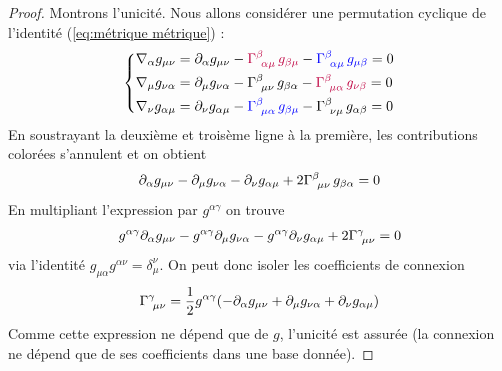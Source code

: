 \begin{proof}
    Montrons l'unicité. Nous allons considérer une permutation cyclique de l'identité (\ref{eq:métrique métrique}) :
    \begin{equation}
        \begin{dcases}
            \nabla_{\alpha}g_{\mu \nu} = \partial_{\alpha}g_{\mu \nu} - \textcolor{purple}{\Gamma\indices{^{\beta}_{\!\alpha \mu}}\,g_{\beta \mu}} - \textcolor{blue}{\Gamma\indices{^{\beta}_{\!\alpha \mu}}\,g_{\mu \beta}} = 0 \\
            \nabla_{\mu}g_{ \nu \alpha } = \partial_{\mu}g_{\nu \alpha} - \Gamma\indices{^{\beta}_{\!\mu \nu}}\,g_{\beta \alpha} - \textcolor{purple}{\Gamma\indices{^{\beta}_{\!\mu \alpha}}\,g_{\nu \beta}} = 0 \\
            \nabla_{\nu}g_{ \alpha \mu } = \partial_{\nu}g_{\alpha \mu} - \textcolor{blue}{\Gamma\indices{^{\beta}_{\!\mu \alpha}}\,g_{\beta \mu}} - \Gamma\indices{^{\beta}_{\!\nu \mu}}\,g_{\alpha \beta} = 0 
        \end{dcases}
    \end{equation}
    En soustrayant la deuxième et troisème ligne à la première, les contributions colorées s'annulent et on obtient
    \begin{equation}
        \partial_{\alpha}g_{\mu \nu} - \partial_{\mu}g_{\nu \alpha} - \partial_{\nu}g_{\alpha \mu} +2\Gamma\indices{^{\beta}_{\!\mu \nu}}\, g_{\beta \alpha} = 0
    \end{equation}
    En multipliant l'expression par $g^{\alpha\gamma}$ on trouve 
    \begin{equation}
        g^{\alpha \gamma}\partial_{\alpha}g_{\mu \nu} - g^{\alpha \gamma}\partial_{\mu}g_{\nu \alpha} - g^{\alpha \gamma}\partial_{\nu}g_{\alpha \mu} +2\Gamma\indices{^{\gamma}_{\!\mu \nu}}  =0
    \end{equation}
    via l'identité $g_{\mu\alpha} g^{\alpha\nu} = \delta_\mu^\nu$. On peut donc isoler les coefficients de connexion
    \begin{equation}
        \Gamma\indices{^{\gamma}_{\!\mu \nu}} = \frac{1}{2}g^{\alpha \gamma}( - \partial_{\alpha}g_{\mu \nu} + \partial_{\mu}g_{\nu \alpha} + \partial_{\nu}g_{\alpha \mu})
    \end{equation}
    Comme cette expression ne dépend que de $g$, l'unicité est assurée (la connexion ne dépend que de ses coefficients dans une base donnée).
\end{proof}
